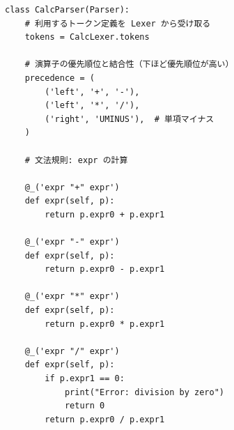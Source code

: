 \documentclass{jarticle}
\begin{document}
\begin{Verbatim}
class CalcParser(Parser):
    # 利用するトークン定義を Lexer から受け取る
    tokens = CalcLexer.tokens

    # 演算子の優先順位と結合性（下ほど優先順位が高い）
    precedence = (
        ('left', '+', '-'),
        ('left', '*', '/'),
        ('right', 'UMINUS'),  # 単項マイナス
    )

    # 文法規則: expr の計算

    @_('expr "+" expr')
    def expr(self, p):
        return p.expr0 + p.expr1

    @_('expr "-" expr')
    def expr(self, p):
        return p.expr0 - p.expr1

    @_('expr "*" expr')
    def expr(self, p):
        return p.expr0 * p.expr1

    @_('expr "/" expr')
    def expr(self, p):
        if p.expr1 == 0:
            print("Error: division by zero")
            return 0
        return p.expr0 / p.expr1\end{Verbatim}
\end{document}
